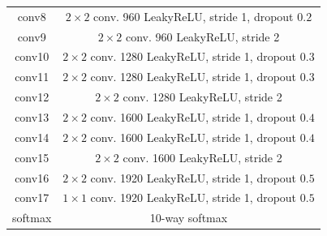 \documentclass{article} %
\begin{document}
\begin{appendix}
\begin{table}[h]
\begin{center}
\begin{tabular}{c|c}
conv8 & $2 \times 2$ conv. 960 LeakyReLU, stride 1, dropout $0.2$\\
conv9 & $2 \times 2$ conv. 960 LeakyReLU, stride 2 \\
conv10 & $2 \times 2$ conv. 1280 LeakyReLU, stride 1, dropout $0.3$\\
conv11 & $2 \times 2$ conv. 1280 LeakyReLU, stride 1, dropout $0.3$\\
conv12 & $2 \times 2$ conv. 1280 LeakyReLU, stride 2 \\
conv13 & $2 \times 2$ conv. 1600 LeakyReLU, stride 1, dropout $0.4$\\
conv14 & $2 \times 2$ conv. 1600 LeakyReLU, stride 1, dropout $0.4$\\
conv15 & $2 \times 2$ conv. 1600 LeakyReLU, stride 2 \\
conv16 & $2 \times 2$ conv. 1920 LeakyReLU, stride 1, dropout $0.5$\\
conv17 & $1 \times 1$ conv. 1920 LeakyReLU, stride 1, dropout $0.5$\\
softmax & 10-way softmax
\end{tabular}
\end{center}
\end{table}



\end{appendix}
\end{document}
